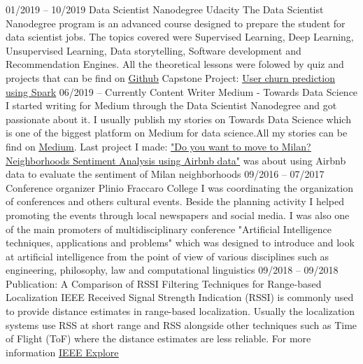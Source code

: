 \documentclass[9pt]{developercv} %
\begin{document}
\begin{entrylist}
	\entry
		{01/2019 -- 10/2019}
		{Data Scientist Nanodegree}
		{Udacity}
		{The Data Scientist Nanodegree program is an advanced course designed to prepare the student for data scientist jobs. The topics covered were Supervised Learning, Deep Learning, Unsupervised Learning, Data storytelling, Software development and Recommendation Engines. All the theoretical lessons were folowed by quiz and projects that can be find on \underline{\href{https://github.com/simonerigoni/udacity/tree/master/data_scientist_nanodegree}{Github}}}
		{}
		{Capstone Project: \underline{\href{https://towardsdatascience.com/user-churn-prediction-using-spark-22ff8dafb5c}{User churn prediction using Spark}}}
	\entry
		{06/2019 -- Currently}
		{Content Writer}
		{Medium -  Towards Data Science}
		{I started writing for Medium through the Data Scientist Nanodegree and got passionate about it. I usually publish my stories on Towards Data Science which is one of the biggest platform on Medium for data science.All my stories can be find on \underline{\href{https://medium.com/@simone.rigoni01}{Medium}}. Last project I made: \underline{\href{https://towardsdatascience.com/do-you-want-to-move-to-milan-neighborhoods-sentiment-analysis-using-airbnb-data-72db72ebc070}{"Do you want to move to Milan? Neighborhoods Sentiment Analysis using Airbnb data"}} was about using Airbnb data to evaluate the sentiment of Milan neighborhoods}
		{}
		{}
	\entry
		{09/2016 -- 07/2017}
		{Conference organizer}
		{Plinio Fraccaro College}
		{I was coordinating the organization of conferences and others cultural events. Beside the planning activity I helped promoting the events through local newspapers and social media. I was also one of the main promoters of multidisciplinary conference "Artificial Intelligence techniques, applications and problems" which was designed to introduce and look at artificial intelligence from the point of view of various disciplines such as engineering, philosophy, law and computational linguistics}
		{}
		{}
	\entry
		{09/2018 -- 09/2018}
		{Publication: A Comparison of RSSI Filtering Techniques for Range-based Localization}
		{IEEE}
		{Received Signal Strength Indication (RSSI) is commonly used to provide distance estimates in range-based localization. Usually the localization systems use RSS at short range and RSS alongside other techniques such as Time of Flight (ToF) where the distance estimates are less reliable. For more information \underline{\href{https://ieeexplore.ieee.org/abstract/document/8502556}{IEEE Explore}}}

\end{entrylist}
\end{document}
